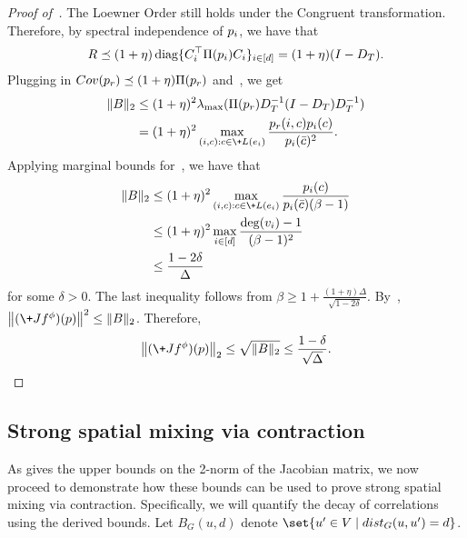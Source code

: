 \begin{proof}[Proof of~]
The Loewner Order still holds under the Congruent transformation. 
Therefore, by spectral independence of $\*p_i$, we have that
\begin{align}\label{eq:bound_R}
    \*R \preceq (1+\eta)\operatorname{diag}\{C^\top_i\Pi(\*p_i)C_i\}_{i\in [d]}
    = (1+\eta)(I - D_T).
\end{align}
Plugging in $\-{Cov}(\*p_r)\preceq (1+\eta)\Pi(\*p_r)$ and~, we get
\begin{align}
    \nonumber \|\*B\|_2 &\leq (1+\eta)^2\lambda_{\max}(\Pi(\*p_r)D_T^{-1}(I - D_T)D_T^{-1})
    \\ \label{eq:marginal_equation} &= (1+\eta)^2\max_{(i,c): c\in \+L(e_i)} \frac{\*p_r(i,c)\*p_i(c)}{\*p_i(\bar{c})^2}.
\end{align}
Applying marginal bounds for~, we have that
\begin{align*}
    \|\*B\|_2  &\leq (1+\eta)^2\max_{(i,c): c\in \+L(e_i)} \frac{\*p_i(c)}{\*p_i(\bar{c})(\beta - 1)}
    \\&\leq (1+\eta)^2\max_{i\in[d]} \frac{\deg(v_i)-1}{(\beta - 1)^2} 
    \\&\leq \frac {1 - 2\delta}{\Delta}
\end{align*}
for some $\delta > 0$.
The last inequality follows from $\beta \geq 1 + \frac{(1 + \eta)\Delta}{\sqrt{1 - 2\delta}}$.
By~, $\norm{(\+J f^\phi)(\*p)}^2 \leq \|\*B\|_2$.
Therefore, 
$$
    \norm{(\+J f^\phi)(\*p)}_2 \leq \sqrt{\|\*B\|_2} \leq \frac{1-\delta}{\sqrt \Delta}.
$$
\end{proof}
\subsection{Strong spatial mixing via contraction}\label{sec:contraction}
\newcommand{\ra}{\rightarrow}
As  gives the upper bounds on the 2-norm of the Jacobian matrix, we now proceed to demonstrate how these bounds can be used to prove strong spatial mixing via contraction. Specifically, we will quantify the decay of correlations using the derived bounds.
Let $B_{G}(u,d)$ denote $\set{u'\in V\mid \dist_G(u,u') = d}$.

